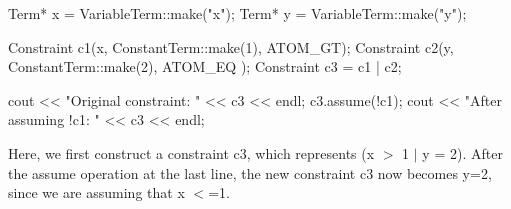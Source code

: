 \begin{DoxyVerb}
     Term* x = VariableTerm::make("x");
     Term* y = VariableTerm::make("y");

     Constraint c1(x, ConstantTerm::make(1), ATOM_GT);
     Constraint c2(y, ConstantTerm::make(2), ATOM_EQ );
     Constraint c3 = c1 | c2;

     cout << "Original constraint: " << c3 << endl;
     c3.assume(!c1);
     cout << "After assuming !c1: " << c3 << endl;

    \end{DoxyVerb}


\-Here, we first construct a constraint c3, which represents (x $>$ 1 $|$ y = 2). \-After the assume operation at the last line, the new constraint c3 now becomes y=2, since we are assuming that x $<$=1. 